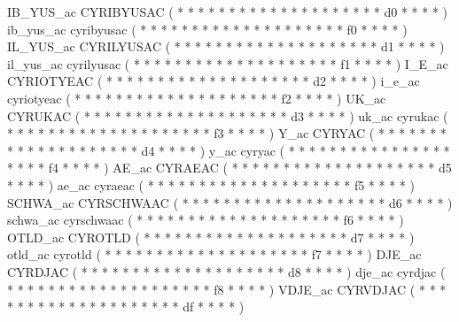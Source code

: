 \makeCOD IB_YUS_ac    CYRIBYUSAC        ( *  *       *  *   *  *  *  *     *  *  *  *  *     *  *  *  *     *  *  *     d0  *  *    *  *   )
\makecod ib_yus_ac    cyribyusac        ( *  *       *  *   *  *  *  *     *  *  *  *  *     *  *  *  *     *  *  *     f0  *  *    *  *   )
\makeCOD IL_YUS_ac    CYRILYUSAC        ( *  *       *  *   *  *  *  *     *  *  *  *  *     *  *  *  *     *  *  *     d1  *  *    *  *   )
\makecod il_yus_ac    cyrilyusac        ( *  *       *  *   *  *  *  *     *  *  *  *  *     *  *  *  *     *  *  *     f1  *  *    *  *   )
\makeCOD I_E_ac       CYRIOTYEAC        ( *  *       *  *   *  *  *  *     *  *  *  *  *     *  *  *  *     *  *  *     d2  *  *    *  *   )
\makecod i_e_ac       cyriotyeac        ( *  *       *  *   *  *  *  *     *  *  *  *  *     *  *  *  *     *  *  *     f2  *  *    *  *   )
\makeCOD UK_ac        CYRUKAC           ( *  *       *  *   *  *  *  *     *  *  *  *  *     *  *  *  *     *  *  *     d3  *  *    *  *   )
\makecod uk_ac        cyrukac           ( *  *       *  *   *  *  *  *     *  *  *  *  *     *  *  *  *     *  *  *     f3  *  *    *  *   )
\makeCOD Y_ac         CYRYAC            ( *  *       *  *   *  *  *  *     *  *  *  *  *     *  *  *  *     *  *  *     d4  *  *    *  *   )
\makecod y_ac         cyryac            ( *  *       *  *   *  *  *  *     *  *  *  *  *     *  *  *  *     *  *  *     f4  *  *    *  *   )
\makeCOD AE_ac        CYRAEAC           ( *  *       *  *   *  *  *  *     *  *  *  *  *     *  *  *  *     *  *  *     d5  *  *    *  *   )
\makecod ae_ac        cyraeac           ( *  *       *  *   *  *  *  *     *  *  *  *  *     *  *  *  *     *  *  *     f5  *  *    *  *   )
\makeCOD SCHWA_ac     CYRSCHWAAC        ( *  *       *  *   *  *  *  *     *  *  *  *  *     *  *  *  *     *  *  *     d6  *  *    *  *   )
\makecod schwa_ac     cyrschwaac        ( *  *       *  *   *  *  *  *     *  *  *  *  *     *  *  *  *     *  *  *     f6  *  *    *  *   )
\makeCOD OTLD_ac      CYROTLD           ( *  *       *  *   *  *  *  *     *  *  *  *  *     *  *  *  *     *  *  *     d7  *  *    *  *   )
\makecod otld_ac      cyrotld           ( *  *       *  *   *  *  *  *     *  *  *  *  *     *  *  *  *     *  *  *     f7  *  *    *  *   )
\makeCOD DJE_ac       CYRDJAC           ( *  *       *  *   *  *  *  *     *  *  *  *  *     *  *  *  *     *  *  *     d8  *  *    *  *   )
\makecod dje_ac       cyrdjac           ( *  *       *  *   *  *  *  *     *  *  *  *  *     *  *  *  *     *  *  *     f8  *  *    *  *   )
\makechr VDJE_ac      CYRVDJAC          ( *  *       *  *   *  *  *  *     *  *  *  *  *     *  *  *  *     *  *  *     df  *  *    *  *   )
